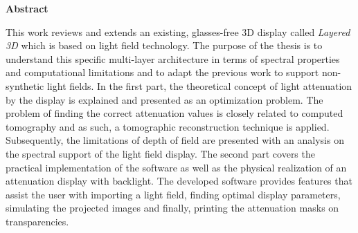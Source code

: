 \thispagestyle{empty}
\vspace{8cm}
\noindent
{\centerline {\bf \large Abstract}}
\vspace{1cm}
\noindent

This work reviews and extends an existing, glasses-free 3D display called \emph{Layered 3D} which is based on light field technology.
The purpose of the thesis is to understand this specific multi-layer architecture in terms of spectral properties and computational limitations and to adapt the previous work to support non-synthetic light fields.
In the first part, the theoretical concept of light attenuation by the display is explained and presented as an optimization problem.
The problem of finding the correct attenuation values is closely related to computed tomography and as such, a tomographic reconstruction technique is applied.
Subsequently, the limitations of depth of field are presented with an analysis on the spectral support of the light field display.
The second part covers the practical implementation of the software as well as the physical realization of an attenuation display with backlight.
The developed software provides features that assist the user with importing a light field, finding optimal display parameters, simulating the projected images and finally, printing the attenuation masks on transparencies.
